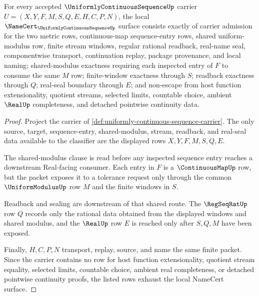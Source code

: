 \begin{theorem}
\label{thm:uniformly-continuous-sequence-namecert-obligations}
For every accepted $\UniformlyContinuousSequenceUp$ carrier $U=(X,Y,F,M,S,Q,E,H,C,P,N)$, the local $\NameCert_{\UniformlyContinuousSequenceUp}$ surface consists exactly of carrier admission for the two metric rows, continuous-map sequence-entry rows, shared uniform-modulus row, finite stream windows, regular rational readback, real-name seal, componentwise transport, continuation replay, package provenance, and local naming; shared-modulus exactness requiring each inspected entry of $F$ to consume the same $M$ row; finite-window exactness through $S$; readback exactness through $Q$; real-seal boundary through $E$; and non-escape from host function extensionality, quotient streams, selected limits, countable choice, ambient $\RealUp$ completeness, and detached pointwise continuity data.
\end{theorem}
\begin{proof}
Project the carrier of \autoref{def:uniformly-continuous-sequence-carrier}. The only source, target, sequence-entry, shared-modulus, stream, readback, and real-seal data available to the classifier are the displayed rows $X,Y,F,M,S,Q,E$.

The shared-modulus clause is read before any inspected sequence entry reaches a downstream Real-facing consumer. Each entry in $F$ is a $\ContinuousMapUp$ row, but the packet exposes it to a tolerance request only through the common $\UniformModulusUp$ row $M$ and the finite windows in $S$.

Readback and sealing are downstream of that shared route. The $\RegSeqRatUp$ row $Q$ records only the rational data obtained from the displayed windows and shared modulus, and the $\RealUp$ row $E$ is reached only after $S,Q,M$ have been exposed.

Finally, $H,C,P,N$ transport, replay, source, and name the same finite packet. Since the carrier contains no row for host function extensionality, quotient stream equality, selected limits, countable choice, ambient real completeness, or detached pointwise continuity proofs, the listed rows exhaust the local NameCert surface.
\end{proof}

